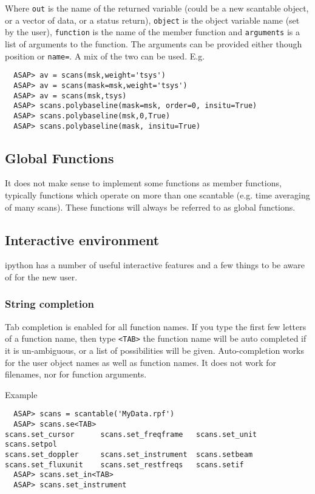 \documentclass[11pt]{article}
\newcommand{\cmd}[1]{{\tt #1}}
\begin{document}
Where \cmd{out} is the name of the returned variable (could be a new
scantable object, or a vector of data, or a status return),
\cmd{object} is the object variable name (set by the user),
\cmd{function} is the name of the member function and \cmd{arguments}
is a list of arguments to the function. The arguments can be provided
either though position or \cmd{name=}.  A mix of the two can be used.
E.g.

\begin{verbatim}
  ASAP> av = scans(msk,weight='tsys')
  ASAP> av = scans(mask=msk,weight='tsys')
  ASAP> av = scans(msk,tsys)
  ASAP> scans.polybaseline(mask=msk, order=0, insitu=True)
  ASAP> scans.polybaseline(msk,0,True)
  ASAP> scans.polybaseline(mask, insitu=True)
\end{verbatim}

\subsection{Global Functions}

It does not make sense to implement some functions as member
functions, typically functions which operate on more than one
scantable (e.g. time averaging of many scans). These functions will
always be referred to as global functions.

\subsection{Interactive environment}

ipython has a number of useful interactive features and a few things
to be aware of for the new user.

\subsubsection{String completion}

Tab completion is enabled for all function names. If you type the
first few letters of a function name, then type {\tt <TAB>} the
function name will be auto completed if it is un-ambiguous, or a list
of possibilities will be given. Auto-completion works for the user
object names as well as function names. It does not work for
filenames, nor for function arguments.

Example
\begin{verbatim}
  ASAP> scans = scantable('MyData.rpf')
  ASAP> scans.se<TAB>
scans.set_cursor      scans.set_freqframe   scans.set_unit        scans.setpol
scans.set_doppler     scans.set_instrument  scans.setbeam
scans.set_fluxunit    scans.set_restfreqs   scans.setif
  ASAP> scans.set_in<TAB>
  ASAP> scans.set_instrument
\end{verbatim}
\end{document}
